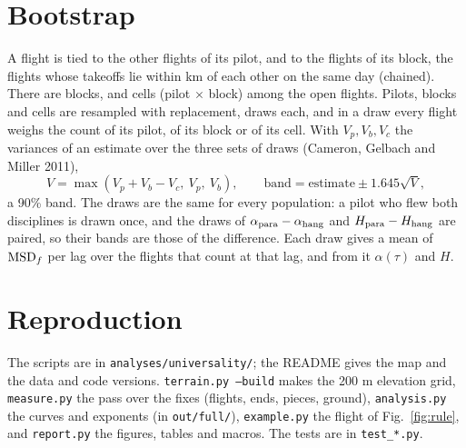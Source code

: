 \section{Bootstrap}\label{app:bootstrap}

A flight is tied to the other flights of its pilot, and to the flights of its block, the flights whose takeoffs lie within
\UniSiteKm{} km of each other on the same day (chained). There are \UniBlocks{} blocks, and \UniCells{} cells (pilot $\times$ block) among the open
flights. Pilots, blocks and cells are resampled with replacement, \UniNBoot{} draws each, and in a draw every flight weighs the count of
its pilot, of its block or of its cell. With $V_p,V_b,V_c$ the variances of an estimate over the three sets of draws (Cameron,
Gelbach and Miller 2011),
\[
  V=\max(V_p+V_b-V_c,\ V_p,\ V_b),\qquad \text{band}=\text{estimate}\pm 1.645\sqrt V,
\]
a 90\% band. The draws are the same for every population: a pilot who flew both disciplines is drawn once, and the draws of
$\alpha_{\rm para}-\alpha_{\rm hang}$ and $H_{\mathrm{para}}-H_{\mathrm{hang}}$ are paired, so their bands are those of the difference. Each draw gives
a mean of $\mathrm{MSD}_f$ per lag over the flights that count at that lag, and from it $\alpha(\tau)$ and $H$.

\section{Reproduction}\label{app:repro}

The scripts are in \texttt{analyses/universality/}; the README gives the map and the data and code versions. \texttt{terrain.py
--build} makes the 200 m elevation grid, \texttt{measure.py} the pass over the fixes (flights, ends, pieces, ground),
\texttt{analysis.py} the curves and exponents (in \texttt{out/full/}), \texttt{example.py} the flight of
Fig.~\ref{fig:rule}, and \texttt{report.py} the figures, tables and macros. The tests are in \texttt{test\_*.py}.

